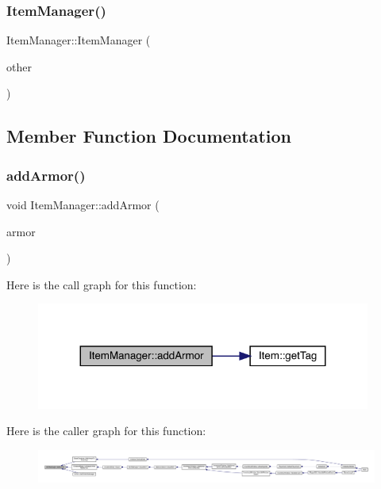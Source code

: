\subsubsection{\texorpdfstring{Item\+Manager()}{ItemManager()}\hspace{0.1cm}{\footnotesize\ttfamily [3/3]}}
{\footnotesize\ttfamily Item\+Manager\+::\+Item\+Manager (\begin{DoxyParamCaption}\item[{\mbox{\hyperlink{class_item_manager}{Item\+Manager}} \&\&}]{other }\end{DoxyParamCaption})}



\subsection{Member Function Documentation}
\mbox{\label{class_item_manager_af16502a871d116ebd2241cd8d2d745f5}} 
\subsubsection{\texorpdfstring{add\+Armor()}{addArmor()}}
{\footnotesize\ttfamily void Item\+Manager\+::add\+Armor (\begin{DoxyParamCaption}\item[{\mbox{\hyperlink{class_armor}{Armor}}}]{armor }\end{DoxyParamCaption})}

Here is the call graph for this function\+:
\nopagebreak
\begin{figure}[H]
\begin{center}
\leavevmode
\includegraphics[width=311pt]{dc/de1/class_item_manager_af16502a871d116ebd2241cd8d2d745f5_cgraph}
\end{center}
\end{figure}
Here is the caller graph for this function\+:
\nopagebreak
\begin{figure}[H]
\begin{center}
\leavevmode
\includegraphics[width=350pt]{dc/de1/class_item_manager_af16502a871d116ebd2241cd8d2d745f5_icgraph}
\end{center}
\end{figure}
\mbox{\label{class_item_manager_af86e2b751da18d6d142c29f8c4860323}} 
